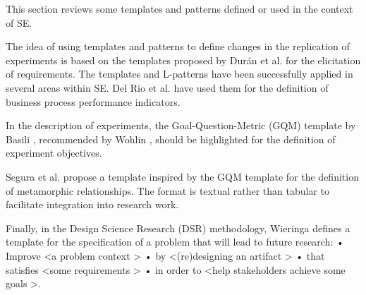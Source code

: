 
This section reviews some templates and patterns defined or used in the context of SE.

The idea of using templates and patterns to define changes in the replication of experiments is based on the templates proposed by Durán et al. \cite{duran1999requirements} for the elicitation of requirements. The templates and L-patterns have been successfully applied in several areas within SE. Del Rio et al. \cite{del2012defining} have used them for the definition of business process performance indicators.

In the description of experiments, the Goal-Question-Metric (GQM) template by Basili \cite{Basili1994}, recommended by Wohlin \cite{wohlin:experimentation}, should be highlighted for the definition of experiment objectives.

Segura et al.  \cite{segura2017template} propose a template inspired by the GQM template for the definition of metamorphic relationships. The format is textual rather than tabular to facilitate integration into research work.

Finally, in the Design Science Research (DSR) methodology, Wieringa \cite{38631e0608b54d4299d5707f3a78debf} defines a template for the specification of a problem that will lead to future research:\newline
%
• Improve \textless a problem context \textgreater  \newline
• by \textless (re)designing an artifact \textgreater \newline
• that satisfies \textless some requirements \textgreater \newline
• in order to \textless help stakeholders achieve some goals \textgreater.



